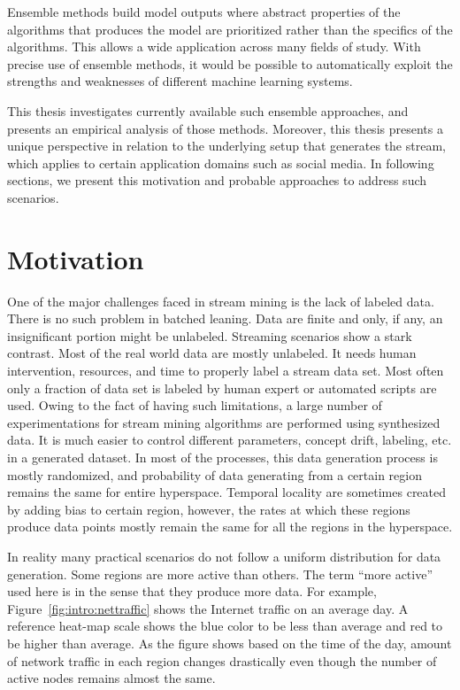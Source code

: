 Ensemble methods build model outputs where abstract properties of the algorithms that produces the model are prioritized rather than the specifics of the algorithms. This allows a wide application across many fields of study. With precise use of ensemble methods, it would be possible to automatically exploit the strengths and weaknesses of different machine learning systems.

This thesis investigates currently available such ensemble approaches, and presents an empirical analysis of those methods. Moreover, this thesis presents a unique perspective in relation to the underlying setup that generates the stream, which applies to certain application domains such as social media. In following sections, we present this motivation and probable approaches to address such scenarios.

\section{Motivation}
\label{sec:intro:motiv}
One of the major challenges faced in stream mining is the lack of labeled data. There is no such problem in batched leaning. Data are finite and only, if any, an insignificant portion might be unlabeled. Streaming scenarios show a stark contrast. Most of the real world data are mostly unlabeled. It needs human intervention, resources, and time to properly label a stream data set. Most often only a fraction of data set is labeled by human expert or automated scripts are used. Owing to the fact of having such limitations, a large number of experimentations for stream mining algorithms are performed using synthesized data. It is much easier to control different parameters, concept drift, labeling, etc. in a generated dataset. In most of the processes, this data generation process is mostly randomized, and probability of data generating from a certain region remains the same for entire hyperspace. Temporal locality are sometimes created by adding bias to certain region, however, the rates at which these regions produce data points mostly remain the same for all the regions in the hyperspace.

In reality many practical scenarios do not follow a uniform distribution for data generation. Some regions are more active than others. The term ``more active'' used here is in the sense that they produce more data. For example, Figure~\ref{fig:intro:nettraffic} shows the Internet traffic on an average day. A reference heat-map scale shows the blue color to be less than average and red to be higher than average. As the figure shows based on the time of the day, amount of network traffic in each region changes drastically even though the number of active nodes remains almost the same.

